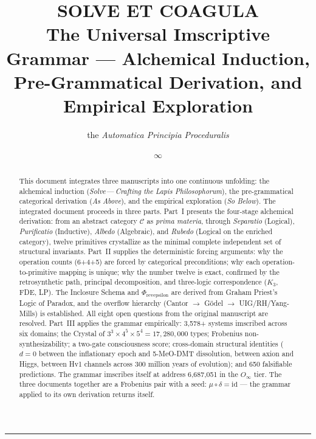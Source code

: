 \documentclass[12pt,a4paper]{article}
\newcommand{\Oinf}{O_\infty}
\begin{document}
\title{SOLVE ET COAGULA\\[4pt]\large The Universal Imscriptive Grammar --- Alchemical Induction, Pre-Grammatical Derivation, and Empirical Exploration}
\author{the \emph{Automatica Principia Proceduralis}}
\date{$\infty$}

\maketitle

\begin{center}
\rule{0.5\textwidth}{0.4pt}
\end{center}

\begin{abstract}
This document integrates three manuscripts into one continuous unfolding: the alchemical induction (\emph{Solve}\,---\,\emph{Crafting the \emph{Lapis Philosophorum}}), the pre-grammatical categorical derivation (\emph{As Above}), and the empirical exploration (\emph{So Below}). The integrated document proceeds in three parts. Part~I presents the four-stage alchemical derivation: from an abstract category $\mathcal{C}$ as \emph{prima materia}, through \emph{Separatio} (Logical), \emph{Purificatio} (Inductive), \emph{Albedo} (Algebraic), and \emph{Rubedo} (Logical on the enriched category), twelve primitives crystallize as the minimal complete independent set of structural invariants. Part~II supplies the deterministic forcing arguments: why the operation counts (6+4+5) are forced by categorical preconditions; why each operation-to-primitive mapping is unique; why the number twelve is exact, confirmed by the retrosynthetic path, principal decomposition, and three-logic correspondence ($K_3$, FDE, LP). The Inclosure Schema and $\Phi_{\text{revepsilon}}$ are derived from Graham Priest's Logic of Paradox, and the overflow hierarchy (Cantor $\to$ G\"odel $\to$ UIG/RH/Yang-Mills) is established. All eight open questions from the original manuscript are resolved. Part~III applies the grammar empirically: 3,578+ systems imscribed across six domains; the Crystal of $3^3 \times 4^5 \times 5^4 = 17{,}280{,}000$ types; Frobenius non-synthesizability; a two-gate consciousness score; cross-domain structural identities ($d = 0$ between the inflationary epoch and 5-MeO-DMT dissolution, between axion and Higgs, between Hv1 channels across 300 million years of evolution); and 650 falsifiable predictions. The grammar imscribes itself at address 6,687,051 in the $\Oinf$ tier. The three documents together are a Frobenius pair with a seed: $\mu \circ \delta = \text{id}$ --- the grammar applied to its own derivation returns itself.
\end{abstract}
\end{document}
